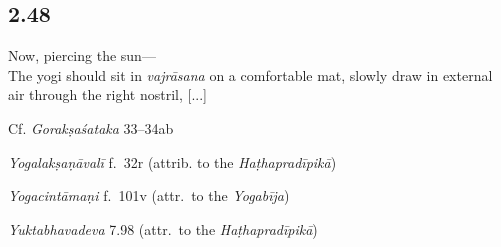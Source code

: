 \begin{ekdosis}
\subsection*{2.48}
\begin{translation}[hp02_048]
Now, piercing the sun---\\
The yogi should sit in \emph{vajrāsana} on a comfortable mat, slowly draw in external air through the right nostril, [...]
\end{translation}

\begin{sources}[hp02_048]
Cf. \emph{Gorakṣaśataka} 33–34ab
\begin{versinnote}
\end{versinnote} 
\end{sources}

\begin{testimonia}[hp02_048]
\emph{Yogalakṣaṇāvalī} f.~32r (attrib. to the \emph{Haṭhapradīpikā})
\begin{versinnote}
\end{versinnote}

\emph{Yogacintāmaṇi} f.~101v (attr.~to the \emph{Yogabīja})

\begin{versinnote}
\end{versinnote} 

\emph{Yuktabhavadeva} 7.98 (attr.~to the \emph{Haṭhapradīpikā})

\begin{versinnote}
\end{versinnote}
\end{testimonia}

\begin{philcomm}[hp02_048]
\end{philcomm}


\end{ekdosis}

